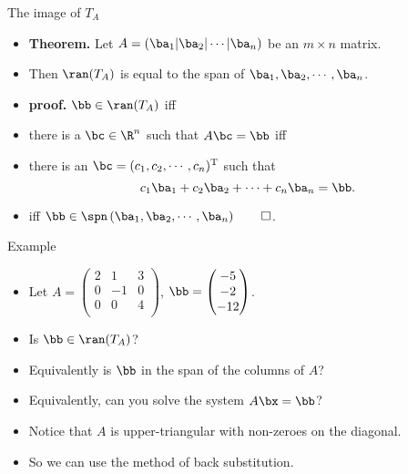 \documentclass[handout]{beamer}
\begin{document}

\begin{frame}{The image of $T_A$}

\begin{itemize}
\item \textbf{Theorem.} Let $A = \left(\ba_1 \vert \ba_2 \vert \cdots \vert \ba_n \right)$
be an $m\times n$ matrix.
\item Then $\ran(T_A)$ is equal to the span of $\ba_1,\ba_2, \cdots,\ba_n$.
\item \textbf{proof.} $\bb\in\ran(T_A)$ iff
\item there is a $\bc\in\R^n$ such that $A\bc=\bb$ iff
\item there is an $\bc=(c_1, c_2,\cdots,c_n)^{\text{T}}$ such that
$$c_1\ba_1 + c_2\ba_2+\cdots+c_n\ba_n = \bb.$$
\item iff $\bb\in\spn\left( \ba_1,\ba_2, \cdots,\ba_n\right) \qed$.
\end{itemize}

\end{frame}


\begin{frame}{Example}

\begin{itemize}
\item Let
$A=
\begin{pmatrix}
2 & 1 &  3 \\
0 & -1 & 0 \\
0 & 0 &  4 \\
\end{pmatrix}
$,
$\bb=
\begin{pmatrix}
 -5 \\
 -2 \\
 -12 \\
\end{pmatrix}
$.
\item Is $\bb\in\ran(T_A)$?
\item Equivalently is $\bb$ in the span of the columns of $A$?
\item Equivalently, can you solve the system $A\bx=\bb$?
\item Notice that $A$ is upper-triangular with non-zeroes on the
diagonal.
\item So we can use the method of back substitution.
\end{itemize}

\end{frame}
\end{document}
